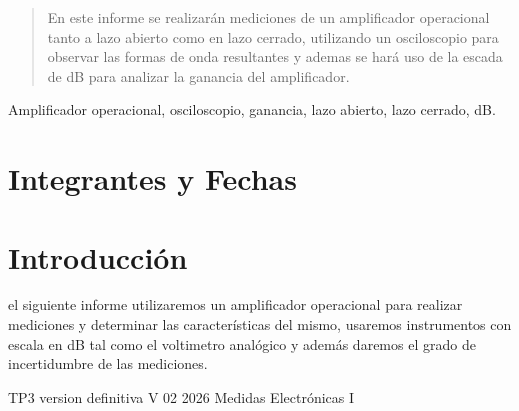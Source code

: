 \documentclass{plantilla}
\begin{document}
\maketitle

\begin{abstract}
En este informe se realizarán mediciones de un amplificador operacional tanto a lazo abierto como en lazo cerrado, utilizando un osciloscopio para observar las formas de onda resultantes y ademas se hará uso de la escada de dB para analizar la ganancia del amplificador. 
\end{abstract}

\begin{IEEEkeywords}
Amplificador operacional, osciloscopio, ganancia, lazo abierto, lazo cerrado, dB.
\end{IEEEkeywords}

\section{Integrantes y Fechas}

\begin{table}[H]
\end{table}

\section{Introducción}
 el siguiente informe utilizaremos un amplificador operacional para realizar mediciones y determinar las características del mismo, usaremos instrumentos con escala en dB tal como el voltimetro analógico y además daremos el grado de incertidumbre de las mediciones.













\begin{thebibliography}{1}
TP3 version definitiva V 02 2026 Medidas Electrónicas I
\end{thebibliography}
\end{document}
